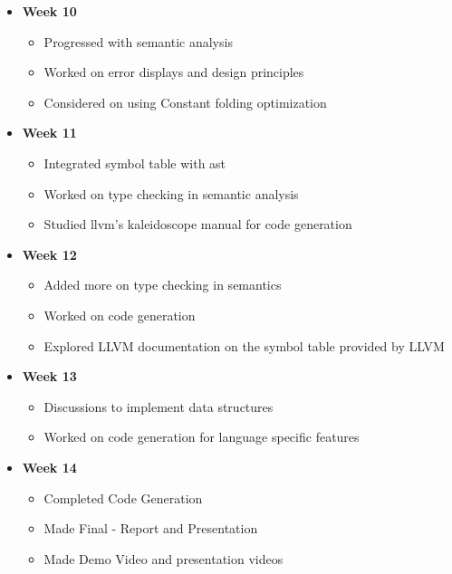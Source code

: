 \documentclass[english,a4paper,12pt]{report}
\begin{document}
\begin{itemize}
        \item\textbf{ Week 10} \begin{itemize}
        \item Progressed with semantic analysis
        \item Worked on error displays and design principles
        \item Considered on using Constant folding optimization
    \end{itemize}

        \item\textbf{ Week 11} \begin{itemize}
        \item Integrated symbol table with ast
        \item Worked on type checking in semantic analysis
        \item Studied llvm's kaleidoscope manual for code generation  
    \end{itemize}

        \item\textbf{ Week 12} \begin{itemize}
        \item Added more on type checking in semantics
        \item Worked on code generation
        \item Explored LLVM documentation on the symbol table provided by LLVM 
    \end{itemize}
    
        \item\textbf{ Week 13} \begin{itemize}
        \item Discussions to implement data structures
        \item Worked on code generation for language specific features
    \end{itemize}

            \item\textbf{ Week 14} \begin{itemize}
        \item Completed Code Generation
        \item Made Final - Report and Presentation
        \item Made Demo Video and presentation videos
    \end{itemize}
\end{itemize}
\end{document}
